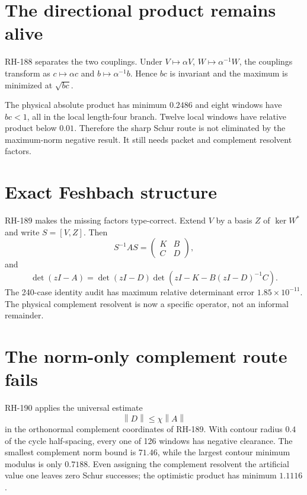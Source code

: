 \documentclass[12pt]{article}
\theoremstyle{remark}
\newcommand{\norm}[1]{\left\lVert#1\right\rVert}
\begin{document}
\section{The directional product remains alive}

RH-188 separates the two couplings.  Under
$V\mapsto\alpha V$, $W\mapsto\alpha^{-1}W$, the couplings transform as
$c\mapsto\alpha c$ and $b\mapsto\alpha^{-1}b$.  Hence $bc$ is invariant and
the maximum is minimized at $\sqrt{bc}$.

The physical absolute product has minimum $0.2486$ and eight windows have
$bc<1$, all in the local length-four branch.  Twelve local windows have
relative product below $0.01$.  Therefore the sharp Schur route is not
eliminated by the maximum-norm negative result.  It still needs packet and
complement resolvent factors.

\section{Exact Feshbach structure}

RH-189 makes the missing factors type-correct.  Extend $V$ by a basis $Z$ of
$\ker W^*$ and write $S=[V,Z]$.  Then
\begin{equation}\label{eq:block}
 S^{-1}AS=\begin{pmatrix}K&B\\C&D\end{pmatrix},
\end{equation}
and
\begin{equation}\label{eq:feshbach}
 \det(zI-A)=\det(zI-D)
 \det\left(zI-K-B(zI-D)^{-1}C\right).
\end{equation}
The 240-case identity audit has maximum relative determinant error
$1.85\times10^{-11}$.  The physical complement resolvent is now a specific
operator, not an informal remainder.

\section{The norm-only complement route fails}

RH-190 applies the universal estimate
\begin{equation}\label{eq:norm-only}
 \norm{D}\le\chi\norm A
\end{equation}
in the orthonormal complement coordinates of RH-189.
With contour radius $0.4$ of the cycle half-spacing, every one of 126
windows has negative clearance.  The smallest complement norm bound is
$71.46$, while the largest contour minimum modulus is only
$0.7188$.  Even assigning the complement resolvent the artificial value one
leaves zero Schur successes; the optimistic product has minimum $1.1116$.
\end{document}
